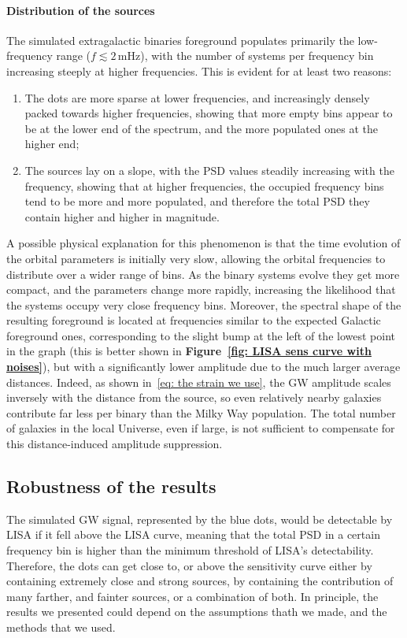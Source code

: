 \paragraph{Distribution of the sources}
The simulated extragalactic binaries foreground populates primarily the low-frequency range ($f \lesssim 2\,\mathrm{mHz}$), with the number of systems per frequency bin increasing steeply at higher frequencies. 
This is evident for at least two reasons:
\begin{enumerate}
    \item The dots are more sparse at lower frequencies, and increasingly densely packed towards higher frequencies, showing that more empty bins appear to be at the lower end of the spectrum, and the more populated ones at the higher end;
    \item The sources lay on a slope, with the PSD values steadily increasing with the frequency, showing that at higher frequencies, the occupied frequency bins tend to be more and more populated, and therefore the total PSD they contain higher and higher in magnitude.
\end{enumerate}
A possible physical explanation for this phenomenon is that the time evolution of the orbital parameters is initially very slow, allowing the orbital frequencies to distribute over a wider range of bins.
As the binary systems evolve they get more compact, and the parameters change more rapidly, increasing the likelihood that the systems occupy very close frequency bins.
Moreover, the spectral shape of the resulting foreground is located at frequencies similar to the expected Galactic foreground ones, corresponding to the slight bump at the left of the lowest point in the graph (this is better shown in \textbf{Figure~\ref{fig: LISA sens curve with noises}}), but with a significantly lower amplitude due to the much {large}r average distances.
Indeed, as shown in~\eqref{eq: the strain we use}, the GW amplitude scales inversely with the distance from the source, so even relatively nearby galaxies contribute far less per binary than the Milky Way population. 
The total number of galaxies in the local Universe, even if {large}, is not sufficient to compensate for this distance-induced amplitude suppression.


\subsection{Robustness of the results}
The simulated GW signal, represented by the blue dots, would be detectable by LISA if it fell above the LISA curve, meaning that the total PSD in a certain frequency bin is higher than the minimum threshold of LISA's detectability.
Therefore, the dots can get close to, or above the sensitivity curve either by containing extremely close and strong sources, by containing the contribution of many farther, and fainter sources, or a combination of both.
In principle, the results we presented could depend on the assumptions thath we made, and the methods that we used.

